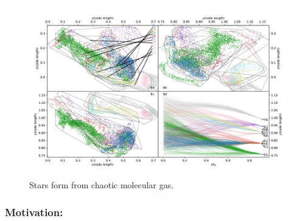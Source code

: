 
\begin{figure} \begin{center}
\includegraphics[width=\textwidth]{figs/overlap_hair_u603_S01.pdf}
\caption[ ]{Stars form from chaotic molecular gas. }
\label{fig.cores} \end{center} \end{figure}
\subsubsection{Motivation: \nameCores}
\label{subsec.turb_motivate}
